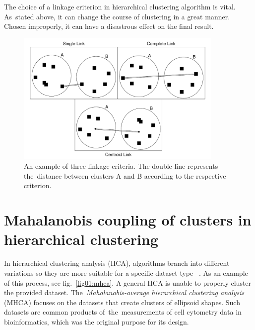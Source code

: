 The choice of a linkage criterion in hierarchical clustering algorithm is vital. As~stated above, it can change the course of clustering in a great manner. Chosen improperly, it can have a disastrous effect on the final result.

\begin{figure}\centering
	\includegraphics[width=10cm]{img/linkage_criteria}
	\caption{An example of three linkage criteria. The double line represents the~distance between clusters A and B according to the respective criterion.}
	\label{fig01:link}
\end{figure}

\section{Mahalanobis coupling of clusters in hierarchical clustering}

In hierarchical clustering analysis (HCA), algorithms branch into different variations so they are more suitable for a specific dataset type~\cite{murtagh2008hierarchical} \cite{oh2004hierarchical} \cite{zhao2005hierarchical}. As an example of this process, see fig.~\ref{fig01:mhca}. A general HCA is unable to properly cluster the provided dataset. The~\emph{Ma\-ha\-la\-no\-bis-average hierarchical clustering analysis} (MHCA) focuses on the datasets that create clusters of ellipsoid shapes. Such datasets are common products of~the~measurements of cell cytometry data in bioinformatics, which was the original purpose for its design.

